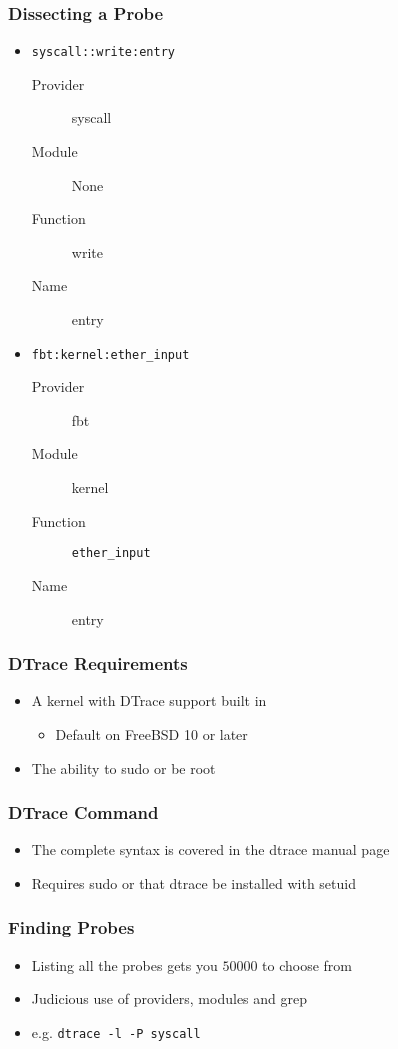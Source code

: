 \documentclass[pdftex]{beamer}
\begin{document}
\begin{frame}[fragile]
  \frametitle{Dissecting a Probe}
  \begin{itemize}
  \item \Verb+syscall::write:entry+
    \begin{description}
    \item[Provider] syscall
    \item[Module] None
    \item[Function] write
    \item[Name] entry
    \end{description}
  \item \Verb+fbt:kernel:ether_input+
    \begin{description}
    \item[Provider] fbt
    \item[Module] kernel
    \item[Function] \Verb+ether_input+
    \item[Name] entry
    \end{description}
  \end{itemize}
\end{frame}

\begin{frame}
  \frametitle{DTrace Requirements}
  \begin{itemize}
  \item A kernel with DTrace support built in
    \begin{itemize}
    \item Default on FreeBSD 10 or later
    \end{itemize}
  \item The ability to sudo or be root
  \end{itemize}
\end{frame}

\begin{frame}
  \frametitle{DTrace Command}
  \begin{itemize}
  \item The complete syntax is covered in the dtrace manual page
  \item Requires sudo or that dtrace be installed with setuid
  \end{itemize}
\end{frame}

\begin{frame}[fragile]
  \frametitle{Finding Probes}
  \begin{itemize}
  \item Listing all the probes gets you $50000$ to choose from
  \item Judicious use of providers, modules and grep 
  \item e.g. \Verb+dtrace -l -P syscall+
  \end{itemize}
\end{frame}
\end{document}
